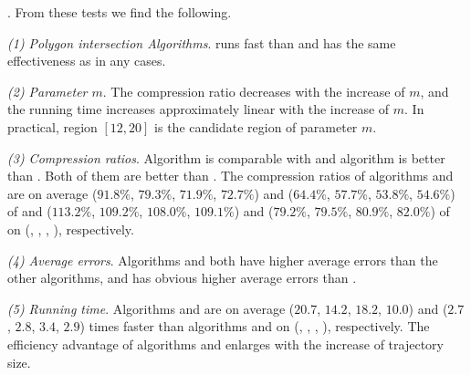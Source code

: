 .
From these tests we find the following.

\vspace{0.5ex}
\ni\emph{(1) Polygon intersection Algorithms}. \rpia runs fast than \cpia and has the same effectiveness as \cpia in any cases.

\vspace{0.5ex}
\ni\emph{(2) Parameter $m$}. The compression ratio decreases with the increase of $m$, and the running time increases approximately linear with the increase of $m$. In practical, region $[12, 20]$ is the candidate region of parameter $m$.

\vspace{0.5ex}
\ni\emph{(3) Compression ratios}. Algorithm \cist is comparable with \dps and algorithm \cista is better than \dps.
Both of them are better than \squishe.
The compression ratios of algorithms \cist and \cista are on average ($91.8\%$, $79.3\%$, $71.9\%$, {$72.7\%$}) and ($64.4\%$, $57.7\%$, $53.8\%$, {$54.6\%$}) of \squishe and ($113.2\%$, $109.2\%$, $108.0\%$, $109.1\%$) and ($79.2\%$, $79.5\%$, $80.9\%$, $82.0\%$) of \dps on (\truck, \sercar, \geolife, \pricar), respectively.


\vspace{0.5ex}
\ni\emph{(4) Average errors}. {Algorithms \cist and \cista both have higher average errors than the other algorithms, and \cista has obvious higher average errors than \cist.}

\vspace{0.5ex}
\ni\emph{(5) Running time}. Algorithms \cist and \cista are on average ($20.7$, $14.2$, $18.2$, $10.0$) and ($2.7$, $2.8$, $3.4$, {$2.9$}) times faster than algorithms \dps and \squishe on (\truck, \sercar, {\geolife}, \pricar), respectively. The efficiency advantage of algorithms \cist and \cista enlarges with the increase of trajectory size.









